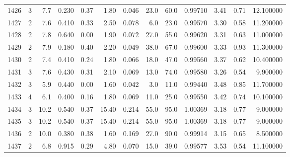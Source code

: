 \begin{tabular}{lrrrrrrrrrrrr}
1426 &        3 &            7.7 &             0.230 &         0.37 &            1.80 &      0.046 &                 23.0 &                  60.0 &  0.99710 &  3.41 &       0.71 &  12.100000 \\
1427 &        2 &            7.6 &             0.410 &         0.33 &            2.50 &      0.078 &                  6.0 &                  23.0 &  0.99570 &  3.30 &       0.58 &  11.200000 \\
1428 &        2 &            7.8 &             0.640 &         0.00 &            1.90 &      0.072 &                 27.0 &                  55.0 &  0.99620 &  3.31 &       0.63 &  11.000000 \\
1429 &        2 &            7.9 &             0.180 &         0.40 &            2.20 &      0.049 &                 38.0 &                  67.0 &  0.99600 &  3.33 &       0.93 &  11.300000 \\
1430 &        2 &            7.4 &             0.410 &         0.24 &            1.80 &      0.066 &                 18.0 &                  47.0 &  0.99560 &  3.37 &       0.62 &  10.400000 \\
1431 &        3 &            7.6 &             0.430 &         0.31 &            2.10 &      0.069 &                 13.0 &                  74.0 &  0.99580 &  3.26 &       0.54 &   9.900000 \\
1432 &        3 &            5.9 &             0.440 &         0.00 &            1.60 &      0.042 &                  3.0 &                  11.0 &  0.99440 &  3.48 &       0.85 &  11.700000 \\
1433 &        4 &            6.1 &             0.400 &         0.16 &            1.80 &      0.069 &                 11.0 &                  25.0 &  0.99550 &  3.42 &       0.74 &  10.100000 \\
1434 &        3 &           10.2 &             0.540 &         0.37 &           15.40 &      0.214 &                 55.0 &                  95.0 &  1.00369 &  3.18 &       0.77 &   9.000000 \\
1435 &        3 &           10.2 &             0.540 &         0.37 &           15.40 &      0.214 &                 55.0 &                  95.0 &  1.00369 &  3.18 &       0.77 &   9.000000 \\
1436 &        2 &           10.0 &             0.380 &         0.38 &            1.60 &      0.169 &                 27.0 &                  90.0 &  0.99914 &  3.15 &       0.65 &   8.500000 \\
1437 &        2 &            6.8 &             0.915 &         0.29 &            4.80 &      0.070 &                 15.0 &                  39.0 &  0.99577 &  3.53 &       0.54 &  11.100000 \\

\end{tabular}
